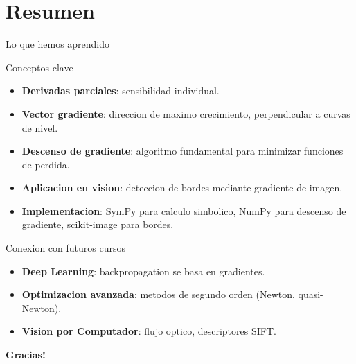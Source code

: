 \documentclass[aspectratio=169, 10pt, xcolor=table]{beamer}
\begin{document}
\section{Resumen}

\begin{frame}{Lo que hemos aprendido}
    \begin{exampleblock}{Conceptos clave}
        \begin{itemize}
            \item \textbf{Derivadas parciales}: sensibilidad individual.
            \item \textbf{Vector gradiente}: direccion de maximo crecimiento, perpendicular a curvas de nivel.
            \item \textbf{Descenso de gradiente}: algoritmo fundamental para minimizar funciones de perdida.
            \item \textbf{Aplicacion en vision}: deteccion de bordes mediante gradiente de imagen.
            \item \textbf{Implementacion}: SymPy para calculo simbolico, NumPy para descenso de gradiente, scikit-image para bordes.
        \end{itemize}
    \end{exampleblock}
\end{frame}

\begin{frame}{Conexion con futuros cursos}
    \begin{itemize}
        \item \textbf{Deep Learning}: backpropagation se basa en gradientes.
        \item \textbf{Optimizacion avanzada}: metodos de segundo orden (Newton, quasi-Newton).
        \item \textbf{Vision por Computador}: flujo optico, descriptores SIFT.
    \end{itemize}
\end{frame}

\begin{frame}
    \centering
    \Huge \textbf{Gracias!}

\end{frame}
\end{document}
